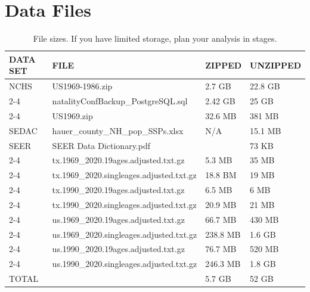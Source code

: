 \section{Data Files}

\begin{table}[htbp]
  \centering
  \caption{File sizes. If you have limited storage, plan your analysis in stages.}
    \begin{tabular}{|l|r|l|l|}
    \toprule
    DATA SET & \multicolumn{1}{l|}{FILE} & ZIPPED & UNZIPPED \\
    \midrule
    NCHS  & \multicolumn{1}{l|}{US1969-1986.zip} & 2.7 GB & 22.8 GB \\
\cmidrule{2-4}          & \multicolumn{1}{l|}{natalityConfBackup\_PostgreSQL.sql} & 2.42 GB & 25 GB \\
\cmidrule{2-4}          & \multicolumn{1}{l|}{US1969.zip} & 32.6 MB & 381 MB \\
    \midrule
    SEDAC & \multicolumn{1}{l|}{hauer\_county\_NH\_pop\_SSPs.xlsx} & N/A   & 15.1 MB \\
    \midrule
    SEER  & \multicolumn{1}{l|}{SEER Data Dictionary.pdf} &       & 73 KB \\
\cmidrule{2-4}          & \multicolumn{1}{l|}{tx.1969\_2020.19ages.adjusted.txt.gz} & 5.3 MB & 35 MB \\
\cmidrule{2-4}          & \multicolumn{1}{l|}{tx.1969\_2020.singleages.adjusted.txt.gz} & 18.8 BM & 19 MB \\
\cmidrule{2-4}          & \multicolumn{1}{l|}{tx.1990\_2020.19ages.adjusted.txt.gz} & 6.5 MB & 6 MB \\
\cmidrule{2-4}          & \multicolumn{1}{l|}{tx.1990\_2020.singleages.adjusted.txt.gz} & 20.9 MB & 21 MB \\
\cmidrule{2-4}          & \multicolumn{1}{l|}{us.1969\_2020.19ages.adjusted.txt.gz} & 66.7 MB & 430 MB \\
\cmidrule{2-4}          & \multicolumn{1}{l|}{us.1969\_2020.singleages.adjusted.txt.gz} & 238.8 MB & 1.6 GB \\
\cmidrule{2-4}          & \multicolumn{1}{l|}{us.1990\_2020.19ages.adjusted.txt.gz} & 76.7 MB & 520 MB \\
\cmidrule{2-4}          & \multicolumn{1}{l|}{us.1990\_2020.singleages.adjusted.txt.gz} & 246.3 MB & 1.8 GB \\
    \midrule
    TOTAL  &       & 5.7 GB & 52 GB \\
    \bottomrule
    \end{tabular}%
  \label{tab:addlabel}%
\end{table}%

